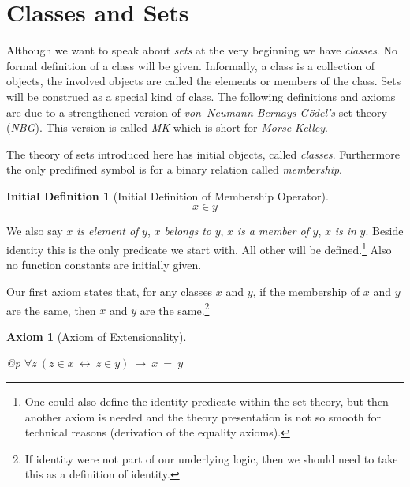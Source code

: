 \documentclass[a4paper,german,10pt,twoside]{book}
\newtheorem{ax}{Axiom}
\theoremstyle{definition}
\newtheorem{idefn}[thm]{Initial Definition}
\theoremstyle{remark}
\begin{document}
\section{Classes and Sets} \label{chapter0_section0} \hypertarget{chapter0_section0}{}
Although we want to speak about \emph{sets} at the very beginning we have \emph{classes}. No formal definition of a class will be given. Informally, a class is a collection of objects, the involved objects are called the elements or members of the class. 
Sets will be construed as a special kind of class. 
The following definitions and axioms are due to a strengthened version of \emph{von~Neumann-Bernays-G{\"o}del's} set theory (\emph{NBG}). This version is called \emph{MK} which is short for \emph{Morse-Kelley}.

\par
The theory of sets introduced here has initial objects, called \emph{classes}. Furthermore the only predifined symbol is for a binary relation called \emph{membership}.

\begin{idefn}[Initial Definition of Membership Operator]
\label{in} \hypertarget{in}{}
$$x \in y$$

\end{idefn}

We also say $x$ \emph{is element of} $y$, $x$ \emph{belongs to} $y$, $x$ \emph{is a member of} $y$, $x$ \emph{is in} $y$.
Beside identity this is the only predicate we start with. All other will be defined.\footnote{One could also define the identity predicate within the set theory, but then another axiom is needed and the theory presentation is not so smooth for technical reasons (derivation of the equality axioms).} Also no function constants are initially given.


\par
Our first axiom states that, for any classes $x$ and $y$, if the membership of $x$ and $y$ are the same, then $x$ and $y$ are the same.\footnote{If identity were not part of our underlying logic, then we should need to take this as a definition of identity.}

\begin{ax}[Axiom of Extensionality]
\label{axiom:extensionality} \hypertarget{axiom:extensionality}{}
\mbox{}
\begin{longtable}{{@{\extracolsep{\fill}}p{\linewidth}}}
\centering $\forall z\ (z \in x\ \leftrightarrow \ z \in y)\ \rightarrow \ x \ =  \ y$
\end{longtable}

\end{ax}
\end{document}
